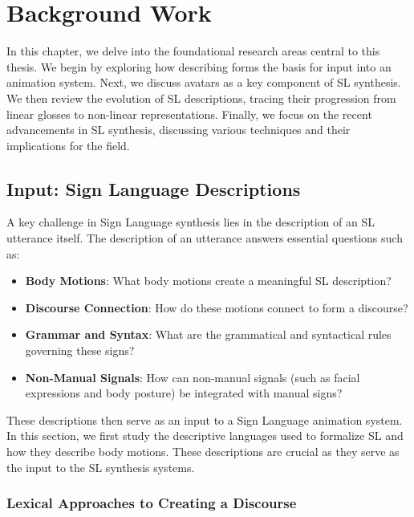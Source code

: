 \documentclass[../../main.tex]{subfiles}
\begin{document}
\chapter{Background Work}
\label{ch:background_work}

In this chapter, we delve into the foundational research areas central to this thesis. We begin by exploring how describing  forms the basis for input into an animation system. Next, we discuss avatars as a key component of SL synthesis. We then review the evolution of SL descriptions, tracing their progression from linear glosses to non-linear representations. Finally, we focus on the recent advancements in SL synthesis, discussing various techniques and their implications for the field.

\section{Input: Sign Language Descriptions}
\label{ch:background_work:sign_language_descriptions}

A key challenge in Sign Language synthesis lies in the description of an SL utterance itself. The description of an utterance answers essential questions such as:

\begin{itemize}
  \item \textbf{Body Motions}: What body motions create a meaningful SL description?
  \item \textbf{Discourse Connection}: How do these motions connect to form a discourse?
  \item \textbf{Grammar and Syntax}: What are the grammatical and syntactical rules governing these signs?
  \item \textbf{Non-Manual Signals}: How can non-manual signals (such as facial expressions and body posture) be integrated with manual signs?
\end{itemize}

These descriptions then serve as an input to a Sign Language animation system. In this section, we first study the descriptive languages used to formalize SL and how they describe body motions. These descriptions are crucial as they serve as the input to the SL synthesis systems.

\subsection{Lexical Approaches to Creating a Discourse}
\label{ch:background_work:sign_language_descriptions:lexical_approaches}
\end{document}
